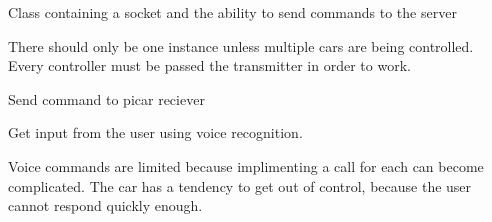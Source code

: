 \documentclass[letterpaper,10pt,english]{sphinxmanual}
\begin{document}

\begin{fulllineitems}
\label{\detokenize{index:client.Transmitter}}
Class containing a socket and the ability to send commands to the server

There should only be one instance unless multiple cars are being controlled.
Every controller must be passed the transmitter in order to work.

\begin{fulllineitems}
\label{\detokenize{index:client.Transmitter.send_cmd}}
Send command to picar reciever

\end{fulllineitems}


\end{fulllineitems}


\begin{fulllineitems}
\label{\detokenize{index:client.voice_command}}
Get input from the user using voice recognition.

Voice commands are limited because implimenting a call for each can become complicated. The car has a tendency to get out of control, because the user cannot respond quickly enough.

\end{fulllineitems}



\renewcommand{\indexname}{Python Module Index}
\begin{sphinxtheindex}
\let\bigletter\sphinxstyleindexlettergroup
\bigletter{c}
\item\relax{}
\indexspace
\bigletter{p}
\item\relax{}
\indexspace
\bigletter{s}
\item\relax{}
\end{sphinxtheindex}

\renewcommand{\indexname}{Index}
\printindex
\end{document}
